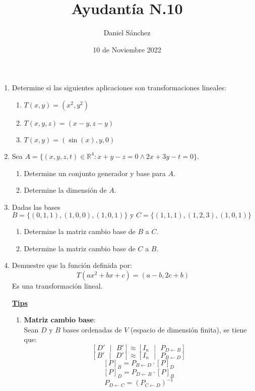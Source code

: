 \documentclass[12pt]{article}
\begin{document}
\title{Ayudant\'ia N.10}
\date{10 de Noviembre 2022}
\author{Daniel S\'anchez}
\maketitle

\begin{enumerate}
    \item Determine si las siguientes aplicaciones son transformaciones lineales:
          \begin{enumerate}
              \item $T(x,y)=(x^2,y^2)$
              \item $T(x,y,z)=(x-y,z-y)$
              \item $T(x,y)=(\sin(x),y,0)$
          \end{enumerate}

    \item Sea $A=\{(x,y,z,t) \in \mathbb{R}^4:x+y-z=0 \wedge 2x+3y-t=0\}$.
          \begin{enumerate}
              \item Determine un conjunto generador y base para $A$.
              \item Determine la dimensi\'on de $A$.
          \end{enumerate}

    \item Dadas las bases $B=\{(0,1,1),(1,0,0),(1,0,1)\} \mbox{ y }
              C=\{(1,1,1),(1,2,3),(1,0,1)\}$
          \begin{enumerate}
              \item Determine la matriz cambio base de $B$ a $C$.
              \item Determine la matriz cambio base de $C$ a $B$.
          \end{enumerate}

    \item Demuestre que la funci\'on definida por:
          $$T(ax^2+bx+c)=(a-b,2c+b)$$
          Es una transformaci\'on lineal.

          \pagebreak
          \begin{center}
              \textbf{\underline{Tips}}
          \end{center}
          \begin{enumerate}
              \item \textbf{Matriz cambio base}:
                    \\Sean $D \mbox{ y } B$ bases ordenadas de $V$ (espacio de
                    dimensi\'on finita), se tiene que:
                    \subitem $$[D'\mbox{ }|\mbox{ }B']\approx [I_n\mbox{ }|\mbox{ }P_{D\leftarrow B}]$$
                    $$[B'\mbox{ }|\mbox{ }D']\approx [I_n\mbox{ }|\mbox{ }P_{B\leftarrow D}]$$
                    $$[P]_B=P_{B\leftarrow D}\cdot [P]_D$$
                    $$[P]_D=P_{D\leftarrow B}\cdot [P]_B$$
                    $$P_{D\leftarrow C}=(P_{C\leftarrow D})^{-1}$$


\end{enumerate}
\end{enumerate}
\end{document}
